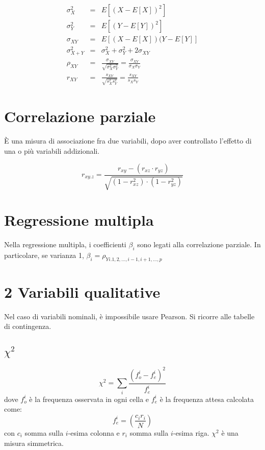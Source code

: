 \documentclass[11pt,onecolumn,a4paper,oneside]{book}
\begin{document}
\begin{eqnarray}
 \sigma^2_X & = & E\left[(X-E\left[X\right])^2\right]\\
 \sigma^2_Y & = & E\left[(Y-E\left[Y\right])^2\right]\\
 \sigma_{XY} & = & E\left[(X-E\left[X\right])(Y-E\left[Y\right]\right]\\
 \sigma^2_{X+Y} & = & \sigma^2_X + \sigma^2_Y + 2 \sigma_{XY}\\
 \rho_{XY} & = & \frac{\sigma_{XY}}{\sqrt{\sigma^2_X \sigma^2_Y}} = \frac{\sigma_{XY}}{\sigma_X \sigma_Y}\\
r_{XY} & = & \frac{s_{XY}}{\sqrt{s^2_X s^2_Y}} = \frac{s_{XY}}{s_X s_Y}
\end{eqnarray}

\section{Correlazione parziale}
È una misura di associazione fra due variabili, dopo aver controllato l'effetto di una o più variabili addizionali.

$$
r_{xy.z} = \frac{r_{xy}- \left(r_{xz} \cdot r_{yz} \right)}{\sqrt{ \left(1-r^2_{xz} \right) \cdot \left(1-r^2_{yz} \right) }} $$

\section{Regressione multipla}

Nella regressione multipla, i coefficienti $\beta_i$ sono legati alla correlazione parziale.
In particolare, se varianza 1, $\beta_i = \rho_{Yi.1,2,\dots ,i-1,i+1, \dots, p}$


\section{2 Variabili qualitative}
Nel caso di variabili nominali, è impossibile usare Pearson. Si ricorre alle tabelle di contingenza.

\subsection{$\chi^2$}
$$\chi^2 = \sum_i \frac{\left( f_o^i - f_e^i \right)^2}{f_e^i}$$
dove $f_o^i$ è la frequenza osservata in ogni cella e $f_e^i$ è la frequenza attesa calcolata come:
$$f_e^i = \left( \frac{c_i r_i}{N} \right)$$
con $c_i$ somma sulla $i$-esima colonna e $r_i$ somma sulla $i$-esima riga.
$\chi^2$ è una misura simmetrica.
\end{document}
